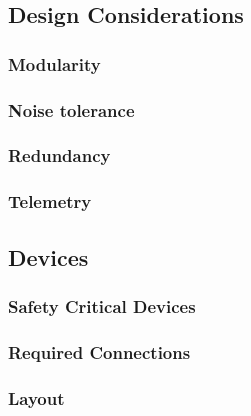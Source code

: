 \subsection{Design Considerations}
\subsubsection{Modularity}
\subsubsection{Noise tolerance}
\subsubsection{Redundancy}
\subsubsection{Telemetry}

\subsection{Devices}
\subsubsection{Safety Critical Devices}
\subsubsection{Required Connections}
\subsubsection{Layout}


